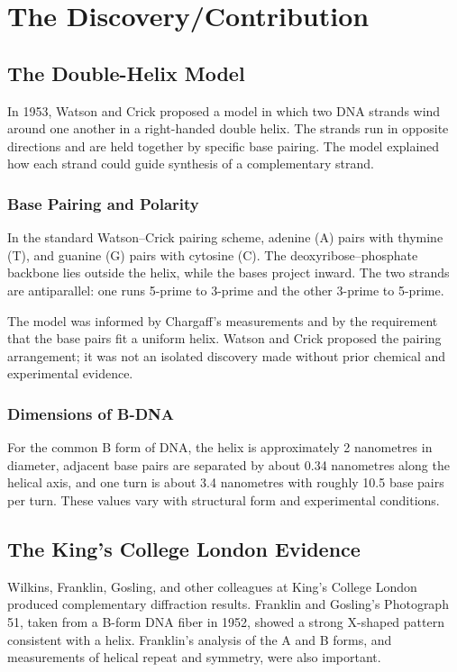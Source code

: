 \section{The Discovery/Contribution}

\subsection{The Double-Helix Model}

In 1953, Watson and Crick proposed a model in which two DNA strands wind around one another in a right-handed double helix. The strands run in opposite directions and are held together by specific base pairing. The model explained how each strand could guide synthesis of a complementary strand.

\subsubsection{Base Pairing and Polarity}

In the standard Watson--Crick pairing scheme, adenine (A) pairs with thymine (T), and guanine (G) pairs with cytosine (C). The deoxyribose--phosphate backbone lies outside the helix, while the bases project inward. The two strands are antiparallel: one runs 5-prime to 3-prime and the other 3-prime to 5-prime.

The model was informed by Chargaff's measurements and by the requirement that the base pairs fit a uniform helix. Watson and Crick proposed the pairing arrangement; it was not an isolated discovery made without prior chemical and experimental evidence.

\subsubsection{Dimensions of B-DNA}

For the common B form of DNA, the helix is approximately 2 nanometres in diameter, adjacent base pairs are separated by about 0.34 nanometres along the helical axis, and one turn is about 3.4 nanometres with roughly 10.5 base pairs per turn. These values vary with structural form and experimental conditions.

\subsection{The King's College London Evidence}

Wilkins, Franklin, Gosling, and other colleagues at King's College London produced complementary diffraction results. Franklin and Gosling's Photograph 51, taken from a B-form DNA fiber in 1952, showed a strong X-shaped pattern consistent with a helix. Franklin's analysis of the A and B forms, and measurements of helical repeat and symmetry, were also important.

